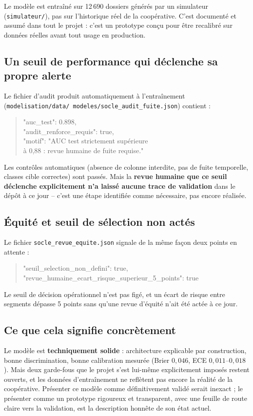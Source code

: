 \documentclass[11pt,a4paper]{article}
\newcommand{\brk}{\allowbreak}
\begin{document}
Le modèle est entraîné sur 12\,690 dossiers générés par un simulateur
(\texttt{simulateur/}), pas sur l'historique réel de la coopérative. C'est documenté et assumé
dans tout le projet : c'est un prototype conçu pour être recalibré sur données réelles avant tout
usage en production.

\subsection{Un seuil de performance qui déclenche sa propre alerte}

Le fichier d'audit produit automatiquement à l'entraînement (\texttt{modelisation/\brk data/\brk
modeles/\brk socle\_audit\_fuite.json}) contient :

\begin{quote}\ttfamily\footnotesize
"auc\_test": 0.898,\\
"audit\_renforce\_requis": true,\\
"motif": "AUC test strictement supérieure\\
à 0,88 : revue humaine de fuite requise."
\end{quote}

Les contrôles automatiques (absence de colonne interdite, pas de fuite temporelle, classes cible
correctes) sont passés. Mais la \textbf{revue humaine que ce seuil déclenche explicitement n'a
laissé aucune trace de validation} dans le dépôt à ce jour -- c'est une étape identifiée comme
nécessaire, pas encore réalisée.

\subsection{Équité et seuil de sélection non actés}

Le fichier \texttt{socle\_revue\_equite.json} signale de la même façon deux points en attente :

\begin{quote}\ttfamily\footnotesize
"seuil\_selection\_non\_defini": true,\\
"revue\_humaine\_ecart\_\brk risque\_superieur\_5\_points": true
\end{quote}

Le seuil de décision opérationnel n'est pas figé, et un écart de risque entre segments dépasse 5
points sans qu'une revue d'équité n'ait été actée à ce jour.

\subsection{Ce que cela signifie concrètement}

Le modèle est \textbf{techniquement solide} : architecture explicable par construction, bonne
discrimination, bonne calibration mesurée (Brier $0{,}046$, ECE $0{,}011$--$0{,}018$). Mais deux
garde-fous que le projet s'est lui-même explicitement imposés restent ouverts, et les données
d'entraînement ne reflètent pas encore la réalité de la coopérative. Présenter ce modèle comme
définitivement validé serait inexact ; le présenter comme un prototype rigoureux et transparent,
avec une feuille de route claire vers la validation, est la description honnête de son état
actuel.
\end{document}
